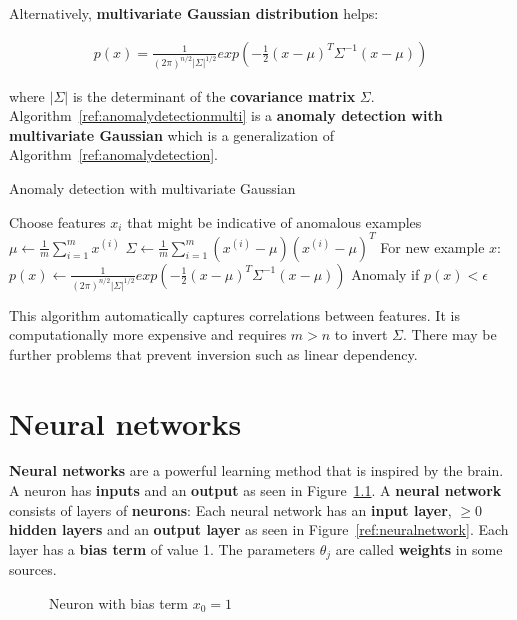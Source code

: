 \documentclass{report}
\begin{document}
Alternatively, {\bf multivariate Gaussian distribution} helps:

\begin{align*}
p(x)=\frac{1}{(2\pi)^{n/2}\vert \Sigma \vert ^{1/2}}exp(-\frac{1}{2}(x-\mu)^T \Sigma^{-1}(x-\mu))
\end{align*}

where $\vert \Sigma \vert$ is the determinant of the {\bf covariance matrix} $\Sigma$. Algorithm~\ref{ref:anomalydetectionmulti} is a {\bf anomaly detection with multivariate Gaussian} which is a generalization of Algorithm~\ref{ref:anomalydetection}.

\begin{algorithm}
\caption{Anomaly detection with multivariate Gaussian}
\label{ref:anomalydetectionmulti}
\begin{algorithmic}
\State Choose features $x_i$ that might be indicative of anomalous examples
\State $\mu \gets \frac{1}{m}\sum_{i=1}^m x^{(i)}$
\State $\Sigma \gets \frac{1}{m}\sum_{i=1}^m(x^{(i)}-\mu)(x^{(i)}-\mu)^T$
\State For new example $x$: $p(x) \gets \frac{1}{(2\pi)^{n/2}\vert \Sigma \vert ^{1/2}}exp(-\frac{1}{2}(x-\mu)^T \Sigma^{-1}(x-\mu))$ 
\State Anomaly if $p(x) < \epsilon$
\end{algorithmic}
\end{algorithm}

This algorithm automatically captures correlations between features. It is computationally more expensive and requires $m>n$ to invert $\Sigma$. There may be further problems that prevent inversion such as linear dependency.


\chapter{Neural networks}
\label{chapter:neuralnetworks}
{\bf Neural networks} are a powerful learning method that is inspired by the brain.
A neuron has {\bf inputs} and an {\bf output} as seen in Figure~\ref{ref:neuron}.
A {\bf neural network} consists of layers of {\bf neurons}:
Each neural network has an {\bf input layer}, $\ge 0$ {\bf hidden layers} and an {\bf output layer} as seen in Figure~\ref{ref:neuralnetwork}.
Each layer has a {\bf bias term} of value 1. The parameters $\theta_j$ are called {\bf weights} in some sources.


\begin{figure}[h!]
\centering
{}
\caption{Neuron with bias term $x_0=1$}
\label{ref:neuron}
\end{figure}
\end{document}
